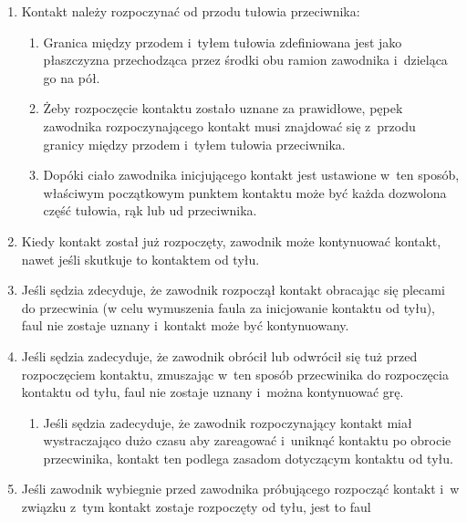 \documentclass[12pt]{article}
\begin{document}
\begin{enumerate}
	\item
	      Kontakt należy rozpoczynać od przodu tułowia przeciwnika:

	      \begin{enumerate}
		      \item
		            Granica między przodem i~tyłem tułowia zdefiniowana jest jako
		            płaszczyzna przechodząca przez środki obu ramion zawodnika i~dzieląca go na pół.
		      \item
		            Żeby rozpoczęcie kontaktu zostało uznane za prawidłowe, pępek
		            zawodnika rozpoczynającego kontakt musi znajdować się z~przodu
		            granicy między przodem i~tyłem tułowia przeciwnika.
		      \item
		            Dopóki ciało zawodnika inicjującego kontakt jest ustawione w~ten
		            sposób, właściwym początkowym punktem kontaktu może być każda
		            dozwolona część tułowia, rąk lub ud przeciwnika.
	      \end{enumerate}
	\item
	      Kiedy kontakt został już rozpoczęty, zawodnik może kontynuować
	      kontakt, nawet jeśli skutkuje to kontaktem od tyłu.
	\item
	      Jeśli sędzia zdecyduje, że zawodnik rozpoczął kontakt obracając się
	      plecami do przecwinia (w celu wymuszenia faula za inicjowanie kontaktu
	      od tyłu), faul nie zostaje uznany i~kontakt może być kontynuowany.
	\item
	      Jeśli sędzia zadecyduje, że zawodnik obrócił lub odwrócił się tuż
	      przed rozpoczęciem kontaktu, zmuszając w~ten sposób przecwinika do
	      rozpoczęcia kontaktu od tyłu, faul nie zostaje uznany i~można
	      kontynuować grę.

	      \begin{enumerate}
		      \item
		            Jeśli sędzia zadecyduje, że zawodnik rozpoczynający kontakt miał
		            wystraczająco dużo czasu aby zareagować i~uniknąć kontaktu po
		            obrocie przecwinika, kontakt ten podlega zasadom dotyczącym kontaktu
		            od tyłu.
	      \end{enumerate}
	\item
	      Jeśli zawodnik wybiegnie przed zawodnika próbującego rozpocząć kontakt
	      i~w związku z~tym kontakt zostaje rozpoczęty od tyłu, jest to faul
\end{enumerate}
\end{document}
